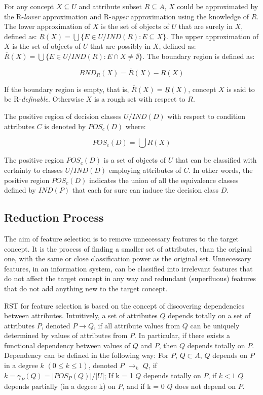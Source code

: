 \documentclass{llncs}
\begin{document}
For any concept $X \subseteq U$ and attribute subset $R \subseteq A$, $X$ could be approximated by the R-\emph{lower} approximation and R-\emph{upper} approximation using the knowledge of $R$. The lower approximation of $X$ is the set of objects of $U$ that are surely in $X$, defined as: $ \underline{R}(X) = \bigcup \{E \in U/IND(R)  : E \subseteq X \}.$ The upper approximation of $X$ is the set of objects of $U$ that are possibly in $X$, defined as: $\overline{R}(X) = \bigcup \{E \in U/IND(R)  : E \cap X \ne \emptyset \}$. The boundary region is defined as:

\begin{displaymath}
BND_R(X) = \overline{R}(X) - \underline{R}(X)
\end{displaymath}

If the boundary region is empty, that is, $\overline{R}(X) = \underline{R}(X)$, concept $X$ is said to be R-\emph{definable}. Otherwise $X$ is a rough set with respect to $R$.

The positive region of decision classes $U/IND(D)$ with respect to condition attributes $C$ is denoted by $POS_c(D)$ where:

\begin{displaymath}
POS_c(D) = \bigcup \overline{R}(X)
\end{displaymath}

The positive region $POS_c(D)$ is a set of objects  of $U$ that can be classified with certainty to classes $U/IND(D)$ employing attributes of $C$. In other words, the positive region $POS_c(D)$ indicates the union of all the equivalence classes defined by $IND(P)$ that each for sure can induce the decision class $D$.
\subsection{Reduction Process}
The aim of feature selection is to remove unnecessary features to the target concept. It is the process of finding a smaller set of attributes, than the original one, with the same or close classification power as the original set. Unnecessary features, in an information system, can be classified into irrelevant features  that do not affect the target concept in any way  and redundant (superfluous) features that do not add anything new to the target concept.

RST for feature selection is based on the concept of  discovering dependencies between attributes. Intuitively, a set of attributes $Q$ depends totally on a set of attributes $P$, denoted $P \rightarrow Q$, if all attribute values from $Q$ can be uniquely determined by values of attributes from $P$. In particular, if there exists a functional dependency between values of $Q$ and $P$, then $Q$ depends totally on $P$. Dependency can be defined in the following way: For $P$, $Q  \subset A$, $Q$  depends on $P$ in a degree $k$ $(0 \leq k \leq 1)$,  denoted $P$ $\rightarrow_{k}$ $Q$, if $k = \gamma_{P}(Q) = |POS_{P}(Q)|/|U|$;  If k = 1 $Q$ depends totally on $P$, if $k < 1 $  $Q$ depends partially (in a degree k) on $P$, and if k = 0 $Q$ does not depend on $P$.
\end{document}

